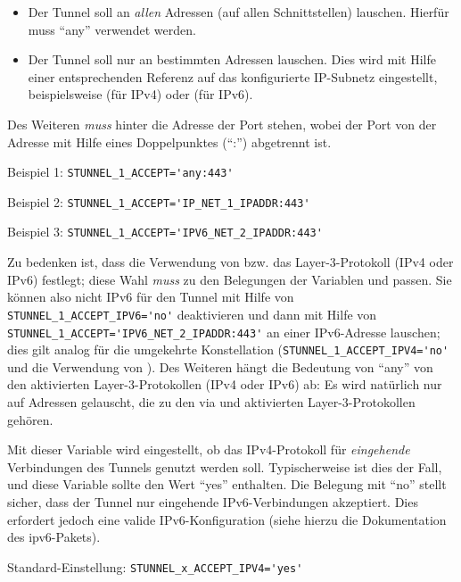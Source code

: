 \begin{description}
\begin{itemize}
\item Der Tunnel soll an \emph{allen} Adressen (auf allen Schnittstellen)
lauschen. Hierfür muss ``any'' verwendet werden.
\item Der Tunnel soll nur an bestimmten Adressen lauschen. Dies wird mit Hilfe
einer entsprechenden Referenz auf das konfigurierte IP-Subnetz eingestellt,
beispielsweise  (für IPv4) oder
 (für IPv6).
\end{itemize}

Des Weiteren \emph{muss} hinter die Adresse der Port stehen, wobei der Port von
der Adresse mit Hilfe eines Doppelpunktes (``:'') abgetrennt ist.

Beispiel 1: \verb+STUNNEL_1_ACCEPT='any:443'+

Beispiel 2: \verb+STUNNEL_1_ACCEPT='IP_NET_1_IPADDR:443'+

Beispiel 3: \verb+STUNNEL_1_ACCEPT='IPV6_NET_2_IPADDR:443'+

Zu bedenken ist, dass die Verwendung von  bzw.
 das Layer-3-Protokoll (IPv4 oder IPv6) festlegt;
diese Wahl \emph{muss} zu den Belegungen der Variablen
 und  passen. Sie
können also nicht IPv6 für den Tunnel mit Hilfe von
\verb+STUNNEL_1_ACCEPT_IPV6='no'+ deaktivieren und dann mit Hilfe von
\verb+STUNNEL_1_ACCEPT='IPV6_NET_2_IPADDR:443'+ an einer IPv6-Adresse lauschen;
dies gilt analog für die umgekehrte Konstellation
(\verb+STUNNEL_1_ACCEPT_IPV4='no'+ und die Verwendung von
). Des Weiteren hängt die Bedeutung von ``any'' von den
aktivierten Layer-3-Protokollen (IPv4 oder IPv6) ab: Es wird natürlich nur auf
Adressen gelauscht, die zu den via  und
 aktivierten Layer-3-Protokollen gehören.


Mit dieser Variable wird eingestellt, ob das IPv4-Protokoll für
\emph{eingehende} Verbindungen des Tunnels genutzt werden soll. Typischerweise
ist dies der Fall, und diese Variable sollte den Wert ``yes'' enthalten. Die
Belegung mit ``no'' stellt sicher, dass der Tunnel nur eingehende
IPv6-Verbindungen akzeptiert. Dies erfordert jedoch eine valide
IPv6-Konfiguration (siehe hierzu die Dokumentation des ipv6-Pakets).

Standard-Einstellung: \verb+STUNNEL_x_ACCEPT_IPV4='yes'+


\end{description}

